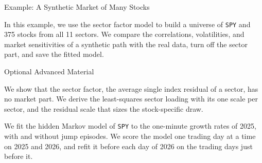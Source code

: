 \documentclass[aspectratio=169,11pt]{beamer}
\newcommand{\repo}{https://github.com/varnerlab/CHEME-5660-CourseRepository-Fall-2026/blob/main/lectures/week-13/L13b}
\begin{document}
\begin{frame}{Example: A Synthetic Market of Many Stocks}
  \vspace{0.3em}
  {\normalsize\textbf{}\par\small
  \href{\repo/CHEME-5660-L13b-Example-JumpHMM-SectorFactor-Fall-2026.ipynb}{}}

  \vspace{0.8em}
  In this example, we use the sector factor model to build a universe of \texttt{SPY} and 375
  stocks from all 11 sectors. We compare the correlations, volatilities, and market sensitivities
  of a synthetic path with the real data, turn off the sector part, and save the fitted model.
\end{frame}

\begin{frame}{Optional Advanced Material}
  \vspace{0.2em}
  {\normalsize\textbf{} \par
  \href{\repo/advanced/sector_factor/CHEME-5660-L13b-Derivation-SectorFactor-Parts-Fall-2026.ipynb}{}}

  \vspace{0.3em}
  We show that the sector factor, the average single index residual of a sector, has no market
  part. We derive the least-squares sector loading with its one scale per sector, and the
  residual scale that sizes the stock-specific draw.

  \vspace{0.6em}
  {\normalsize\textbf{} \par
  \href{\repo/advanced/one_minute/CHEME-5660-L13b-Advanced-JumpHMM-SPY-OneMinute-Fall-2026.ipynb}{}}

  \vspace{0.3em}
  We fit the hidden Markov model of \texttt{SPY} to the one-minute growth rates of 2025, with
  and without jump episodes. We score the model one trading day at a time on 2025 and 2026, and
  refit it before each day of 2026 on the trading days just before it.
\end{frame}
\end{document}
